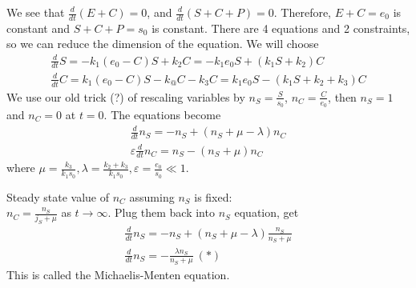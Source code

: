 \documentclass[a4paper]{article}
\begin{document}
We see that $\frac{d}{dt} (E+C)=0$, and $\frac{d}{dt} (S+C+P)=0$. Therefore, $E+C=e_0$ is constant and $S+C+P=s_0$ is constant. There are 4 equations and 2 constraints, so we can reduce the dimension of the equation. We will choose
\begin{equation*}
\begin{aligned}
\frac{d}{dt} S = -k_1(e_0-C) S + k_2 C = -k_1e_0 S + (k_1S+k_2) C\\
\frac{d}{dt} C = k_1(e_0-C)S - k_@C - k_3C = k_1 e_0 S - (k_1S+k_2+k_3) C
\end{aligned}
\end{equation*}
We use our old trick (?) of rescaling variables by $n_S = \frac{S}{s_0}$, $n_C = \frac{C}{e_0}$, then $n_S=1$ and $n_C=0$ at $t=0$. The equations become 
\begin{equation*}
\begin{aligned}
\frac{d}{dt} n_S = -n_S + (n_S + \mu-\lambda) n_C\\
\varepsilon \frac{d}{dt} n_C = n_S - (n_S+\mu) n_C
\end{aligned}
\end{equation*}
where $\mu = \frac{k_3}{k_1s_0}, \lambda = \frac{k_2+k_3}{k_1s_0}, \varepsilon = \frac{e_0}{s_0} \ll 1$.

Steady state value of $n_C$ assuming $n_S$ is fixed:\\
$n_C = \frac{n_S}{j_S+\mu}$ as $t \to \infty$. Plug them back into $n_S$ equation, get
\begin{equation*}
\begin{aligned}
\frac{d}{dt} n_S = -n_S + (n_S+\mu-\lambda) \frac{n_S}{n_S+\mu}\\
\frac{d}{dt} n_S = -\frac{\lambda n_S}{n_S + \mu} \ (*)
\end{aligned}
\end{equation*}
This is called the Michaelis-Menten equation.
\end{document}
